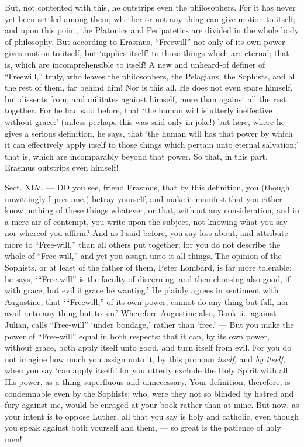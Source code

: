 But, not contented with this, he outstrips even the philosophers. For it has never yet been settled among them, whether or not any thing can give motion to itself; and upon this point, the Platonics and Peripatetics are divided in the whole body of philosophy. But according to Erasmus, “Freewill” not only of its own power gives motion to itself, but ‘applies itself’ to those things which are eternal; that is, which are incomprehensible to itself! A new and unheard-of definer of “Freewill,” truly, who leaves the philosophers, the Pelagians, the Sophists, and all the rest of them, far behind him! Nor is this all. He does not even spare himself, but dissents from, and militates against himself, more than against all the rest together. For he had said before, that ‘the human will is utterly ineffective without grace:’ (unless perhaps this was said only in joke!) but here, where he gives a serious definition, he says, that ‘the human will has that power by which it can effectively apply itself to those things which pertain unto eternal salvation;’ that is, which are incomparably beyond that power. So that, in this part, Erasmus outstrips even himself!


Sect. XLV. — DO you see, friend Erasmus, that by this definition, you (though unwittingly I presume,) betray yourself, and make it manifest that you either know nothing of these things whatever, or that, without any consideration, and in a mere air of contempt, you write upon the subject, not knowing what you say nor whereof you affirm? And as I said before, you say less about, and attribute more to “Free-will,” than all others put together; for you do not describe the whole of “Free-will,” and yet you assign unto it all things. The opinion of the Sophists, or at least of the father of them, Peter Lombard, is far more tolerable: he says, ‘“Free-will” is the faculty of discerning, and then choosing also good, if with grace, but evil if grace be wanting.’ He plainly agrees in sentiment with Augustine, that ‘“Freewill,” of its own power, cannot do any thing but fall, nor avail unto any thing but to sin.’ Wherefore Augustine also, Book ii., against Julian, calls “Free-will” ‘under bondage,’ rather than ‘free.’ — But you make the power of “Free-will” equal in both respects: that it can, by its own power, without grace, both apply itself unto good, and turn itself from evil. For you do not imagine how much you assign unto it, by this pronoun \emph{itself, }and \emph{by itself, }when you say ‘can apply itself:’ for you utterly exclude the Holy Spirit with all His power, as a thing superfluous and unnecessary. Your definition, therefore, is condemnable even by the Sophists; who, were they not so blinded by hatred and fury against me, would be enraged at your book rather than at mine. But now, as your intent is to oppose Luther, all that you say is holy and catholic, even though you speak against both yourself and them, — so great is the patience of holy men!

